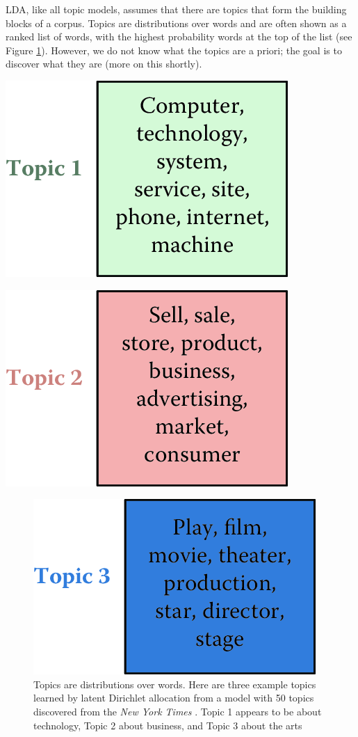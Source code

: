 \documentclass[]{krantz}
\begin{document}
LDA, like all topic models, assumes that there are topics that form the
building blocks of a corpus. Topics are distributions over words and are
often shown as a ranked list of words, with the highest probability
words at the top of the list (see Figure \ref{fig:nyt-topics-3}).
However, we do not know what the topics are a priori; the goal is to
discover what they are (more on this shortly).

\begin{center}\includegraphics[width=0.5\linewidth]{ChapterText/figures/nyt_topics-1} \end{center}

\begin{center}\includegraphics[width=0.5\linewidth]{ChapterText/figures/nyt_topics-2} \end{center}

\begin{figure}

{\centering \includegraphics[width=0.5\linewidth]{ChapterText/figures/nyt_topics-3} 

}

\caption{Topics are distributions over words. Here are three example topics learned by latent Dirichlet allocation from a model with 50 topics discovered from the \textit{New York Times} \citep{sandhaus-08}. Topic 1 appears to be about technology, Topic 2 about business, and Topic 3 about the arts}\label{fig:nyt-topics-3}
\end{figure}
\end{document}
